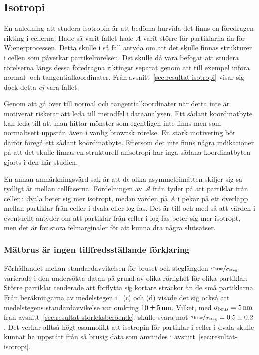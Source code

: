 \subsection{Isotropi}

En anledning att studera isotropin är att bedöma hurvida det finns en föredragen rikting i cellerna. Hade så varit fallet hade $A$ varit större för partiklarna än för Wienerprocessen. Detta skulle i så fall antyda om att det skulle finnas strukturer i cellen som påverkar partikelrörelsen. Det skulle då vara befogat att studera rörelserna längs dessa föredragna riktingar separat genom att till exempel införa normal- och tangentialkoordinater. Från avsnitt~\ref{sec:resultat-isotropi} visar sig dock detta \emph{ej} vara fallet.

Genom att gå över till normal och tangentialkoordinater när detta inte är motiverat riskerar att leda till metodfel i dataanalysen. Ett sådant koordinatbyte kan leda till att man hittar mönster som egentligen inte finns men som normaltsett uppstår, även i vanlig brownsk rörelse. En stark motivering bör därför föregå ett sådant koordinatbyte. Eftersom det inte finns några indikationer på att det skulle finnas en strukturell anisotropi har inga sådana koordinatbyten gjorts i den här studien.


En annan anmärkningsvärd sak är att de olika asymmetrimåtten skiljer sig så tydligt åt mellan cellfaserna. Fördelningen av $\mathcal{A}$ från  tyder på att partiklar från celler i dvala beter sig mer isotropt, medan värden på $A$ i  pekar på ett överlapp mellan partiklar från celler i dvala eller log-fas. Det är till och med så att värden i  eventuellt antyder om att partiklar från celler i log-fas beter sig mer isotropt, men det är för stora felmarginaler för att kunna dra några slutsatser.

\subsubsection{Mätbrus är ingen tillfredsställande förklaring}
Förhållandet mellan standardavvikelsen för bruset och steglängden $\nicefrac{\sigma_\text{brus}}{\sigma_\text{steg}}$ varierade i den undersökta datan på grund av olika rörlighet för olika partiklar. Större partiklar tenderade att förflytta sig kortare sträckor än de små partiklarna. Från beräkningarna av medelstegen i ~(c) och (d) visade det sig också att medelstegens standardavvikelse var omkring $\unit[10\pm 5]{nm}$. Vilket, med $\sigma_\text{brus}=\unit[5]{nm}$ från avsnitt~\ref{sec:resultat-storleksberoende}, skulle svara mot $\nicefrac{\sigma_\text{brus}}{\sigma_\text{steg}}=0.5\pm 0.2$. Det verkar alltså högt osannolikt att isotropin för partiklar i celler i dvala skulle kunnat ha uppstått från så brusig data som användes i avsnitt~\ref{sec:resultat-isotropi}. 

